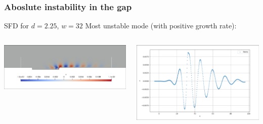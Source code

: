 \documentclass[
  aspectratio=169, %
  t, %
  onlytextwidth, %
  10pt, %
]{beamer}
\begin{document}
\begin{frame}
	\frametitle{Aboslute instability in the gap}
	SFD for $d=2.25$, $w=32$ 
	Most unstable mode (with positive growth rate):
\begin{columns}[T] %
		\begin{column}{0.48\linewidth} %
			\centering
			\includegraphics[width=\linewidth]{Images/abs_mode_inside_gap.png}
		\end{column}
		\begin{column}{0.48\linewidth} %
			\centering
			\includegraphics[width=\linewidth]{Images/spatial_evolution_absmode.png}
		\end{column}
	\end{columns}

  
\end{frame}
\end{document}
